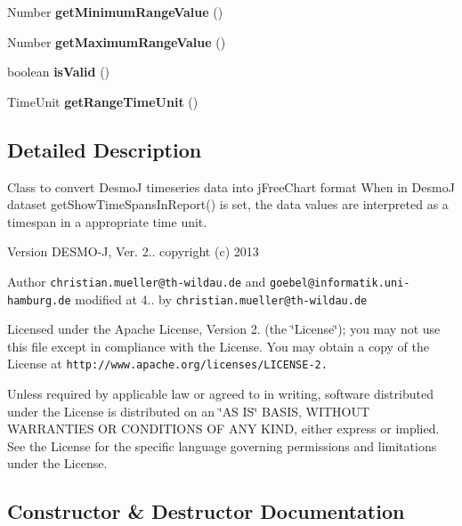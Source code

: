 \begin{DoxyCompactItemize}
\item 
Number {\bfseries get\-Minimum\-Range\-Value} ()\label{classdesmoj_1_1extensions_1_1grafic_1_1util_1_1_time_series_data_set_adapter_ab308817430e1f28ae4019c92e1fbc8fc}

\item 
Number {\bfseries get\-Maximum\-Range\-Value} ()\label{classdesmoj_1_1extensions_1_1grafic_1_1util_1_1_time_series_data_set_adapter_a17248ab8924bd03e2514dda435f5db29}

\item 
boolean {\bf is\-Valid} ()
\item 
Time\-Unit {\bf get\-Range\-Time\-Unit} ()
\end{DoxyCompactItemize}


\subsection{Detailed Description}
Class to convert Desmo\-J timeseries data into j\-Free\-Chart format When in Desmo\-J dataset get\-Show\-Time\-Spans\-In\-Report() is set, the data values are interpreted as a timespan in a appropriate time unit.

\begin{DoxyVersion}{Version}
D\-E\-S\-M\-O-\/\-J, Ver. 2.. copyright (c) 2013 
\end{DoxyVersion}
\begin{DoxyAuthor}{Author}
{\tt christian.\-mueller@th-\/wildau.\-de} and {\tt goebel@informatik.\-uni-\/hamburg.\-de} modified at 4.. by {\tt christian.\-mueller@th-\/wildau.\-de}
\end{DoxyAuthor}
Licensed under the Apache License, Version 2. (the \char`\"{}\-License\char`\"{}); you may not use this file except in compliance with the License. You may obtain a copy of the License at {\tt http\-://www.\-apache.\-org/licenses/\-L\-I\-C\-E\-N\-S\-E-\/2.}

Unless required by applicable law or agreed to in writing, software distributed under the License is distributed on an \char`\"{}\-A\-S I\-S\char`\"{} B\-A\-S\-I\-S, W\-I\-T\-H\-O\-U\-T W\-A\-R\-R\-A\-N\-T\-I\-E\-S O\-R C\-O\-N\-D\-I\-T\-I\-O\-N\-S O\-F A\-N\-Y K\-I\-N\-D, either express or implied. See the License for the specific language governing permissions and limitations under the License. 

\subsection{Constructor \& Destructor Documentation}
